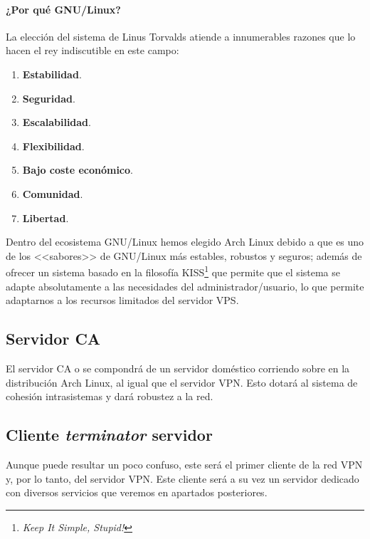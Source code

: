 \documentclass[a4paper, 11pt, titlepage]{article}
\begin{document}
        \paragraph{¿Por qué GNU/Linux?} La elección del sistema de Linus Torvalds atiende a innumerables
        razones que lo hacen el rey indiscutible en este campo:

        \begin{enumerate}
            \item \textbf{Estabilidad}. 
            \item \textbf{Seguridad}. 
            \item \textbf{Escalabilidad}. 
            \item \textbf{Flexibilidad}. 
            \item \textbf{Bajo coste económico}. 
            \item \textbf{Comunidad}. 
            \item \textbf{Libertad}. 
        \end{enumerate}

        Dentro del ecosistema GNU/Linux hemos elegido Arch Linux debido a que es uno de los <<sabores>> de 
        GNU/Linux más estables, robustos y seguros; además de ofrecer un sistema basado en la filosofía 
        KISS\footnote{\textit{Keep It Simple, Stupid!}} que permite que el sistema se adapte absolutamente
        a las necesidades del administrador/usuario, lo que permite adaptarnos a los recursos limitados del
        servidor VPS.

    \subsection{Servidor CA}

        El servidor CA o se compondrá de un servidor doméstico corriendo sobre en la distribución Arch Linux, al igual
        que el servidor VPN. Esto dotará al sistema de cohesión intrasistemas y dará robustez a la red.

    \subsection{Cliente \textit{terminator} servidor}

        Aunque puede resultar un poco confuso, este será el primer cliente de la red VPN y, por lo tanto,
        del servidor VPN. Este cliente será a su vez un servidor dedicado con diversos servicios que veremos
        en apartados posteriores.
\end{document}
